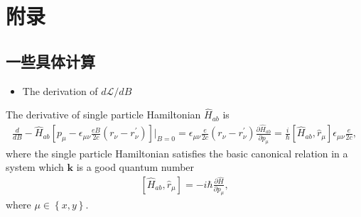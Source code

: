 \documentclass[10pt, oneside]{article}
\newcommand{\pr}{\prime}
\newcommand{\pa}{\partial}
\newcommand{\p}[1]{\left(#1\right)}
\newcommand{\bb}[1]{\left[#1\right]}
\newcommand{\br}[1]{\left\{#1\right\}}
\begin{document}
\section{附录}
\subsection{一些具体计算}
\begin{itemize}
	\item The derivation of \(d \mathcal{L} / d B\) 
\end{itemize}
The derivative of single particle Hamiltonian \(\hat{H}_{ab}\) is 
\begin{align}
	\frac{d}{d B} - \hat{H}_{ab} \bb{p_\mu - \epsilon_{\mu \nu} \frac{e B}{2 c} \p{r_\nu - r^{\pr}_{\nu}} } \Bigg|_{B = 0}  = \epsilon_{\mu \nu} \frac{e}{2 c} \p{r_\nu - r^{\pr}_{\nu}} \frac{\pa \hat{H}_{ab}}{\pa p_{\mu}} = \frac{i}{\hbar} \bb{\hat{H}_{ab}, \hat{r}_{\mu}} \epsilon_{\mu\nu} \frac{e}{2c},
\end{align}
where the single particle Hamiltonian satisfies the basic canonical relation in a system which \(\bm{k}\) is a good quantum number
\begin{align}
	\bb{\hat{H}_{ab}, \hat{r}_{\mu}} = - i \hbar \frac{\pa \hat{H}}{\pa p_{\mu}},
\end{align}
where \(\mu \in \br{x,y}\).
\end{document}
